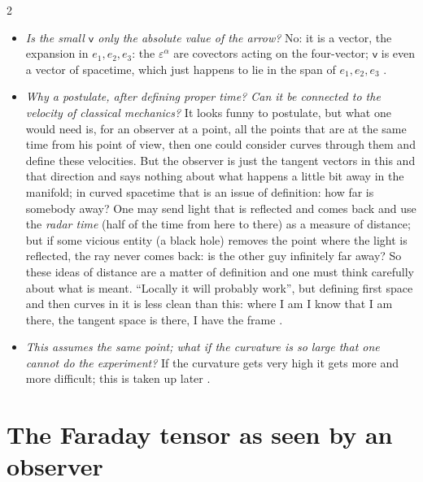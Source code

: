 \begin{paracol}{2}
\begin{coursenote}
\begin{itemize}
  \item \emph{Is the small $\mathsf v$ only the absolute value of the arrow?} No: it is a vector, the expansion in $e_1,e_2,e_3$: the $\varepsilon^\alpha$ are covectors acting on the four-vector; $\mathsf v$ is even a vector of spacetime, which just happens to lie in the span of $e_1,e_2,e_3$ .
  \item \emph{Why a postulate, after defining proper time? Can it be connected to the velocity of classical mechanics?} It looks funny to postulate, but what one would need is, for an observer at a point, all the points that are at the same time from his point of view, then one could consider curves through them and define these velocities. But the observer is just the tangent vectors in this and that direction and says nothing about what happens a little bit away in the manifold; in curved spacetime that is an issue of definition: how far is somebody away? One may send light that is reflected and comes back and use the \emph{radar time} (half of the time from here to there) as a measure of distance; but if some vicious entity (a black hole) removes the point where the light is reflected, the ray never comes back: is the other guy infinitely far away? So these ideas of distance are a matter of definition and one must think carefully about what is meant. ``Locally it will probably work'', but defining first space and then curves in it is less clean than this: where I am I know that I am there, the tangent space is there, I have the frame .
  \item \emph{This assumes the same point; what if the curvature is so large that one cannot do the experiment?} If the curvature gets very high it gets more and more difficult; this is taken up later .
\end{itemize}
\end{coursenote}

\section{The Faraday tensor as seen by an observer}\label{sec:c13-faraday}


\end{paracol}
